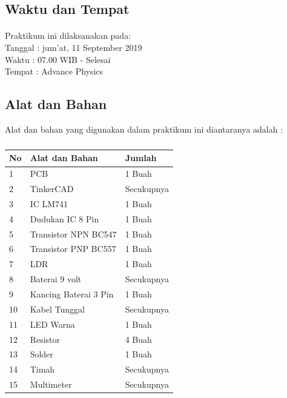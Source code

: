\documentclass[12pt,a4paper]{article}
\begin{document}
\subsection{Waktu dan Tempat}
\paragraph{ }
Praktikum ini dilaksanakan pada:
\\ 		Tanggal : jum'at, 11 September 2019
\\ 		Waktu : 07.00 WIB - Selesai
\\ 		Tempat : Advance Physics 


\subsection{Alat dan Bahan}
Alat dan bahan yang digunakan dalam praktikum ini diantaranya adalah : 
\subparagraph*{ }
\begin{tabular}{|l|l|l|}  \hline
No & Alat dan Bahan  & Jumlah  \\ \hline
1  & PCB & 1 Buah \\ \hline
2  & TinkerCAD & Secukupnya \\ \hline
3  & IC LM741 & 1 Buah \\ \hline
4  & Dudukan IC 8 Pin & 1 Buah \\ \hline
5  & Transistor NPN BC547 & 1 Buah \\ \hline
6  & Transistor PNP BC557 & 1 Buah \\ \hline
7  & LDR & 1 Buah \\ \hline
8  & Baterai 9 volt & Secukupnya \\ \hline
9  & Kancing Baterai 3 Pin & 1 Buah \\ \hline
10 & Kabel Tunggal  & Secukupnya \\ \hline
11 & LED Warna & 1 Buah \\ \hline
12 & Resistor  & 4 Buah \\ \hline
13 & Solder & 1 Buah \\ \hline
14 & Timah & Secukupnya \\ \hline
15 & Multimeter & Secukupnya \\ \hline
\end{tabular}

  
    
\end{document}
